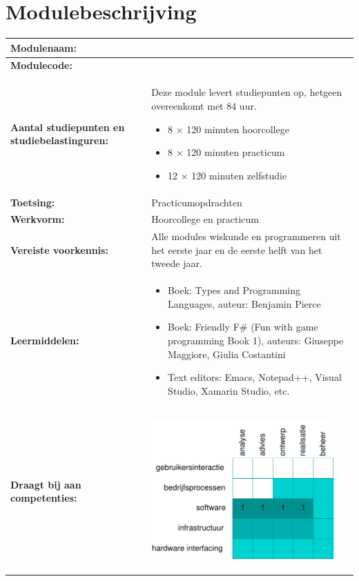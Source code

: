 \section*{Modulebeschrijving}
\begin{tabularx}{\textwidth}{|>{\columncolor{lichtGrijs}} p{}|X|}
	\hline
	\textbf{Modulenaam:} & \modulenaam\\
	\hline
	\textbf{Modulecode: }& \modulecode\\
	\hline
	\textbf{Aantal studiepunten \newline en studiebelastinguren:} & Deze module levert \stdPunten studiepunten op, hetgeen overeenkomt met 84 uur.
	\begin{itemize}
		\item 8 $\times$ 120 minuten hoorcollege
		\item 8 $\times$ 120 minuten practicum
		\item 12 $\times$ 120 minuten zelfstudie
	\end{itemize} \\
	\hline
	\textbf{Toetsing:} & Practicumopdrachten \\
	\hline
	\textbf{Werkvorm:} & Hoorcollege en practicum \\
	\hline
	\textbf{Vereiste voorkennis:}&Alle modules wiskunde en programmeren uit het eerste jaar en de eerste helft van het tweede jaar.\\
	\hline
	\textbf{Leermiddelen:}  &
		\begin{itemize}
			\item Boek: Types and Programming Languages, auteur: Benjamin Pierce
			\item Boek: Friendly F\# (Fun with game programming Book 1), auteurs: Giuseppe Maggiore, Giulia Costantini
			\item Text editors: Emacs, Notepad++, Visual Studio, Xamarin Studio, etc.
		\end{itemize} \\
	\hline
	\textbf{Draagt bij aan \newline competenties:} &
	\begin{center}
		\includegraphics[width=7cm]{img/comptabel.pdf}

\end{center}
\end{tabularx}
